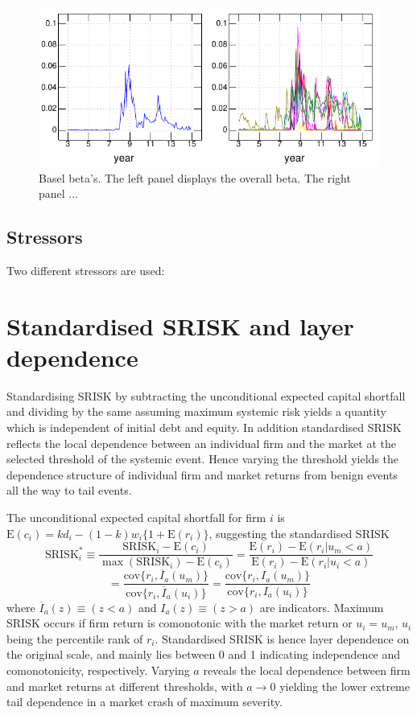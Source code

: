 \documentclass[authoryear]{elsarticle}
\newcommand{\E}{\mathrm{E}}
\newcommand{\cov}{\mathrm{cov}}
\begin{document}
\begin{figure}[htbp]
\begin{center}
\includegraphics{Bbeta.pdf}
\caption{Basel beta's.  The left panel displays the overall beta.   The right panel ...}
\label{Bbeta}
\end{center}
\end{figure}

\subsection{Stressors}

Two different stressors are used:   



\section{Standardised SRISK and layer dependence}

Standardising SRISK by subtracting the unconditional expected capital shortfall and dividing by the same assuming maximum systemic risk yields a quantity which is independent of initial debt and equity. In addition standardised SRISK reflects the local dependence between an individual firm and the market at the selected threshold of the systemic event. Hence varying the threshold yields the dependence structure of individual firm and market returns from benign events all the way to tail events.

The unconditional expected capital shortfall for firm $i$ is $\E(c_i)=kd_i-(1-k)w_i\{1+\E(r_i)\}$, suggesting the standardised SRISK
$$
\mathrm{SRISK}_i^* \equiv \frac{\mathrm{SRISK}_i-\E(c_i)}{\max(\mathrm{SRISK}_i)-\E(c_i)}
=\frac{\E(r_i)-\E(r_i|u_m<a)}{\E(r_i)-\E(r_i|u_i<a)}
$$
$$
=\frac{\cov\{r_i,\overline{I}_a(u_m)\}}{\cov\{r_i,\overline{I}_a(u_i)\}}
=\frac{\cov\{r_i,I_a(u_m)\}}{\cov\{r_i,I_a(u_i)\}} 
$$
where $\overline{I}_a(z)\equiv (z<a)$ and $I_a(z)\equiv (z>a)$ are indicators. Maximum SRISK occurs if firm return is comonotonic with the market return or $u_i=u_m$, $u_i$ being the percentile rank of $r_i$. Standardised SRISK is hence layer dependence on the original scale, and mainly lies between 0 and 1 indicating independence and comonotonicity, respectively. Varying $a$ reveals the local dependence between firm and market returns at different thresholds, with $a\rightarrow 0$ yielding the lower extreme tail dependence in a market crash of maximum severity.
\end{document}
